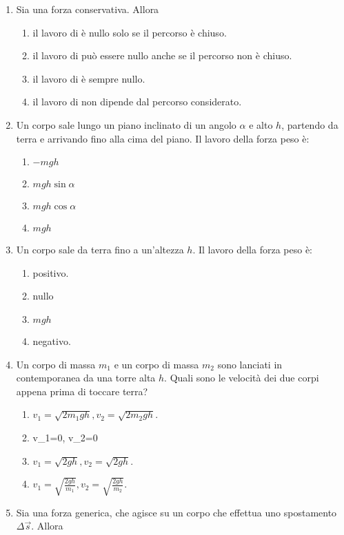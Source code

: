 \documentclass{article}
\begin{document}
\begin{enumerate}
  \item Sia  una forza conservativa. Allora
  \begin{enumerate}[label=\Alph*.]
    \item il lavoro di  è nullo solo se il percorso è chiuso.
    \item il lavoro di  può essere nullo anche se il percorso non è chiuso.
    \item il lavoro di  è sempre nullo.
    \item il lavoro di  non dipende dal percorso considerato.
  \end{enumerate}
  \item Un corpo sale lungo un piano inclinato di un angolo $\alpha$ e alto $h$, partendo da terra e arrivando fino alla cima del piano. Il lavoro della forza peso è:
  \begin{enumerate}[label=\Alph*.]
    \item $-mgh$
    \item $mgh\sin\alpha$
    \item $mgh\cos\alpha$
    \item $mgh$
  \end{enumerate}
  \item Un corpo sale da terra fino a un'altezza $h$. Il lavoro della forza peso è:
  \begin{enumerate}[label=\Alph*.]
    \item positivo.
    \item nullo
    \item $mgh$
    \item negativo.
  \end{enumerate}
  \item Un corpo di massa $m_1$ e un corpo di massa $m_2$ sono lanciati in contemporanea da una torre alta $h$. Quali sono le velocità dei due corpi appena prima di toccare terra?
  \begin{enumerate}[label=\Alph*.]
    \item $v_1=\sqrt{2m_1gh}, v_2=\sqrt{2m_2gh}$.
    \item v_1=0, v_2=0
    \item $v_1=\sqrt{2gh}, v_2=\sqrt{2gh}$.
    \item $v_1=\sqrt{\frac{2gh}{m_1}}, v_2=\sqrt{\frac{2gh}{m_2}}$.
  \end{enumerate}
  \item Sia  una forza generica, che agisce su un corpo che effettua uno spostamento $\Delta \vec{s}$. Allora

\end{enumerate}
\end{document}
